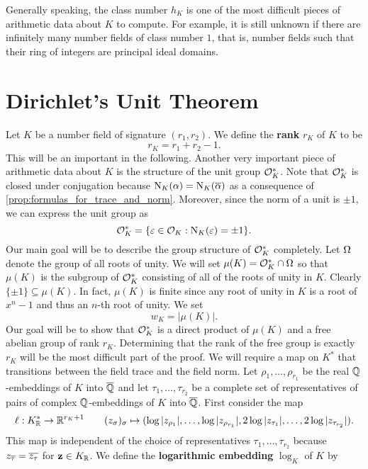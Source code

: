     Generally speaking, the class number $h_{K}$ is one of the most difficult pieces of arithmetic data about $K$ to compute. For example, it is still unknown if there are infinitely many number fields of class number $1$, that is, number fields such that their ring of integers are principal ideal domains.
  \section{Dirichlet's Unit Theorem}
    Let $K$ be a number field of signature $(r_{1},r_{2})$. We define the \textbf{rank} $r_{K}$ of $K$ to be
    \[
      r_{K} = r_{1}+r_{2}-1.
    \]
    This will be an important in the following. Another very important piece of arithmetic data about $K$ is the structure of the unit group $\mathcal{O}_{K}^{\ast}$. Note that $\mathcal{O}_{K}^{\ast}$ is closed under conjugation because $\operatorname{\mathrm{N}}_{K}(\alpha) = \operatorname{\mathrm{N}}_{K}(\overline{\alpha})$ as a consequence of \cref{prop:formulas_for_trace_and_norm}. Moreover, since the norm of a unit is $\pm1$, we can express the unit group as
    \[
      \mathcal{O}_{K}^{\ast} = \{\varepsilon \in \mathcal{O}_{K}:\operatorname{\mathrm{N}}_{K}(\varepsilon) = \pm 1\}.
    \]
    Our main goal will be to describe the group structure of $\mathcal{O}_{K}^{\ast}$ completely. Let $\Omega$ denote the group of all roots of unity. We will set $\mu(K) = \mathcal{O}_{K}^{\ast} \cap \Omega$ so that $\mu(K)$ is the subgroup of $\mathcal{O}_{K}^{\ast}$ consisting of all of the roots of unity in $K$. Clearly $\{\pm 1\} \subseteq \mu(K)$. In fact, $\mu(K)$ is finite since any root of unity in $K$ is a root of $x^{n}-1$ and thus an $n$-th root of unity. We set
    \[
      w_{K} = |\mu(K)|.
    \]
    Our goal will be to show that $\mathcal{O}_{K}^{\ast}$ is a direct product of $\mu(K)$ and a free abelian group of rank $r_{K}$. Determining that the rank of the free group is exactly $r_{K}$ will be the most difficult part of the proof. We will require a map on $K^{\ast}$ that transitions between the field trace and the field norm. Let $\rho_{1},\ldots,\rho_{r_{1}}$ be the real $\mathbb{Q}$-embeddings of $K$ into $\overline{\mathbb{Q}}$ and let $\tau_{1},\ldots,\tau_{r_{2}}$ be a complete set of representatives of pairs of complex $\mathbb{Q}$-embeddings of $K$ into $\overline{\mathbb{Q}}$. First consider the map
    \[
      \ell:K_{\mathbb{R}}^{\ast} \to \mathbb{R}^{r_{K}+1} \qquad (z_{\sigma})_{\sigma} \mapsto (\log|z_{\rho_{1}}|,\ldots,\log|z_{\rho_{r_{1}}}|,2\log|z_{\tau_{1}}|,\ldots,2\log|z_{\tau_{r_{2}}}|).
    \]
    This map is independent of the choice of representatives $\tau_{1},\ldots,\tau_{r_{2}}$ because $z_{\overline{\tau}} = \overline{z_{\tau}}$ for $\mathbf{z} \in K_{\mathbb{R}}$.
    We define the \textbf{logarithmic embedding} $\log_{K}$ of $K$ by
